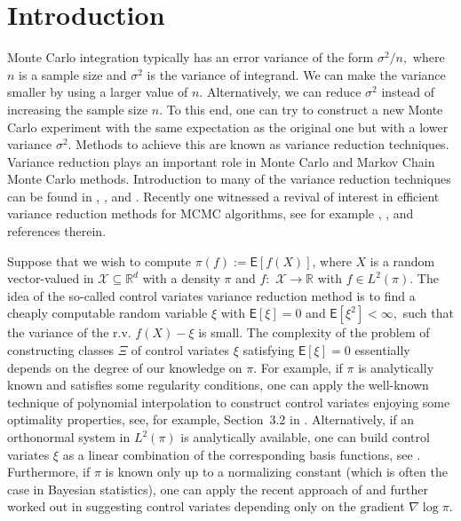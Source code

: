 \documentclass[aap,preprint]{imsart}
\begin{document}
\section{Introduction}

Monte Carlo integration typically has an error variance of the form
$\sigma^{2}/n,$ where $n$ is a sample size and \(\sigma^2\) is the variance of  integrand. We can make the variance smaller
by using a larger value of $n$.  Alternatively,
 we can  reduce $\sigma^2$ instead of increasing the sample size \(n\). To this end, one can try to construct
a new Monte Carlo experiment with the same expectation as the original one
but with a lower variance $\sigma^2$. Methods to achieve this are known as variance
reduction techniques. Variance reduction plays an important role in
Monte Carlo and Markov Chain Monte Carlo methods. Introduction to many of the variance reduction techniques can be found in \cite{christian1999monte}, \cite{rubinstein2016simulation}, \cite{GobetBook} and \cite{glasserman2013monte}. Recently one witnessed a revival of interest in efficient variance reduction methods  for MCMC algorithms, see for example \cite{dellaportas2012control}, \cite{mira2013zero}, \cite{brosse2018diffusion} and references therein.
\par
Suppose that we wish to compute $\pi(f):=\mathsf{E}\left[f(X)\right]$, where $X$
is a random vector-valued in $\mathcal{X}\subseteq\mathbb{R}^{d}$ with a density $\pi$ and $f:$
$\mathcal{X}\to\mathbb{R}$ with $f\in L^2(\pi)$.
The idea of the so-called control variates variance reduction method
 is to find a cheaply computable random variable $\xi$ with $\mathsf{E}[\xi]=0$ and \(\mathsf{E}[\xi^2]<\infty,\)
such that the variance of the r.v. $f(X)-\xi$ is small.  The complexity of the problem of constructing classes $\Xi$ of control variates \(\xi\) satisfying   $\mathsf{E}[\xi]=0$ essentially depends on the degree of our knowledge on \(\pi.\)
For example, if \(\pi\) is analytically known and satisfies some regularity conditions, one can apply the well-known technique of  polynomial interpolation to construct control variates enjoying  some optimality properties, see, for example, Section~3.2 in \cite{dimov2008monte}. Alternatively, if an orthonormal system in \(L^2(\pi)\) is analytically available, one can build control variates \(\xi\) as a linear combination of the corresponding basis functions, see \cite{GobetCV}. Furthermore, if \(\pi\) is known only up to a normalizing constant (which is often the case in Bayesian statistics), one can apply the recent approach of
 \cite{mira2013zero} and further worked out in \cite{oates2017control}  suggesting  control variates  depending only on the gradient \(\nabla \log \pi.\)
\end{document}
